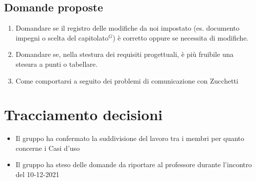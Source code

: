 \subsection{Domande proposte}
\begin{enumerate}
	\item Domandare se il registro delle modifiche da noi impostato (es. documento impegni o scelta del capitolato$^{G}$) è corretto oppure se necessita di modifiche.
	\item Domandare se, nella stestura dei requisiti progettuali, è più fruibile una stesura a punti o tabellare.
	\item Come comportarsi a seguito dei problemi di comunicazione con Zucchetti
\end{enumerate}

\section{Tracciamento decisioni}
\begin{itemize}
	\item Il gruppo ha confermato la suddivisione del lavoro tra i membri per quanto concerne i Casi d'uso
	\item Il gruppo ha steso delle domande da riportare al professore durante l'incontro del 10-12-2021
\end{itemize}